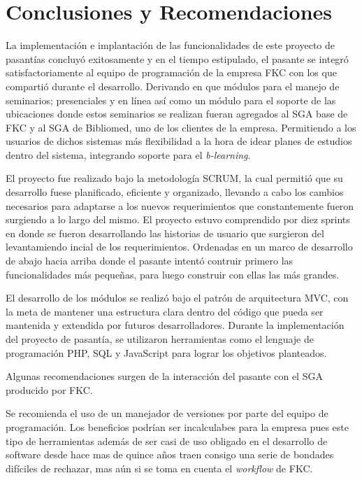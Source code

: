 \chapter*{Conclusiones y Recomendaciones}
\thispagestyle{empty} %
 

La implementación e implantación de las funcionalidades de este proyecto de pasantías concluyó exitosamente y en el tiempo estipulado, el pasante se integró satisfactoriamente al equipo de programación de la empresa FKC con los que compartió durante el desarrollo. Derivando en que módulos para el manejo de seminarios; presenciales y en línea así como un módulo para el soporte de las ubicaciones donde estos seminarios se realizan fueran agregados al SGA base de FKC y al SGA de Bibliomed, uno de los clientes de la empresa. Permitiendo a los usuarios de dichos sistemas más flexibilidad a la hora de idear planes de estudios dentro del sistema, integrando soporte para el \emph{b-learning}.

El proyecto fue realizado bajo la metodología SCRUM, la cual permitió que su desarrollo fuese planificado, eficiente y organizado, llevando a cabo los cambios necesarios para adaptarse a los nuevos requerimientos que constantemente fueron surgiendo a lo largo del mismo. El proyecto estuvo comprendido por diez sprints en donde se fueron desarrollando las historias de usuario que surgieron del levantamiendo incial de los requerimientos. Ordenadas en un marco de desarrollo de abajo hacia arriba donde el pasante intentó contruir primero las funcionalidades más pequeñas, para luego construir con ellas las más grandes.

El desarrollo de los módulos se realizó bajo el patrón de arquitectura MVC, con la meta de mantener una estructura clara dentro del código que pueda ser mantenida y extendida por futuros desarrolladores. Durante la implementación del proyecto de pasantía, se utilizaron herramientas como el lenguaje de programación PHP, SQL y JavaScript para lograr los objetivos planteados.

Algunas recomendaciones surgen de la interacción del pasante con el SGA producido por FKC.

Se recomienda el uso de un manejador de versiones por parte del equipo de programación. Los beneficios podrían ser incalculabes para la empresa pues este tipo de herramientas además de ser casi de uso obligado en el desarrollo de software desde hace mas de quince años traen consigo una serie de bondades difíciles de rechazar, mas aún si se toma en cuenta el \emph{workflow} de FKC. 

